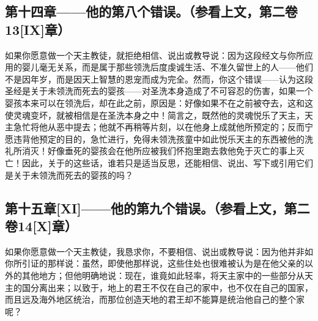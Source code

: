 
\subsection{第十四章——他的第八个错误。（参看上文，第二卷13[IX]章）}

如果你愿意做一个天主教徒，就拒绝相信、说出或教导说：因为这段经文与你所应用的婴儿毫无关系，而是属于那些领洗后度虔诚生活、不准久留世上的人——他们不是因年岁，而是因天上智慧的恩宠而成为完全。然而，你这个错误——认为这段圣经是关于未领洗而死去的婴孩——对圣洗本身造成了不可容忍的伤害，如果一个婴孩本来可以在领洗后，却在此之前，原因是：好像如果不在之前被夺去，这和这使灵魂变坏，就被相信是在圣洗本身之中！简言之，既然他的灵魂悦乐了天主，天主急忙将他从恶中提去；他就不再稍等片刻，以在他身上成就他所预定的；反而宁愿违背他预定的目的，急忙进行，免得未领洗孩童中如此悦乐天主的东西被他的洗礼所消灭！好像垂死的婴孩会在他所应被我们怀抱里跑去救他免于灭亡的事上灭亡！因此，关于的这些话，谁若只是适当反思，还能相信、说出、写下或引用它们是关于未领洗而死去的婴孩的吗？\par


\subsection{第十五章[XI]——他的第九个错误。（参看上文，第二卷14[X]章）}

如果你愿意做一个天主教徒，我恳求你，不要相信、说出或教导说：因为他并非如你所引证的那样说：虽然，即使他那样说，这些住处也很难被认为是在他父亲的以外的其他地方；但他明确地说：现在，谁竟如此轻率，将天主家中的一些部分从天主的国分离出来；以致于，地上的君王不仅在自己的家中，也不仅在自己的国家，而且远及海外地区统治，而那位创造天地的君王却不能算是统治他自己的整个家呢？\par

